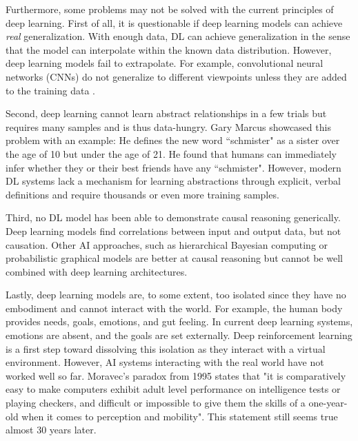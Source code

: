 Furthermore, some problems may not be solved with the current principles of deep learning.
First of all, it is questionable if deep learning models can achieve \emph{real} generalization.
With enough data, DL can achieve generalization in the sense that the model can interpolate within the known data distribution.
However, deep learning models fail to extrapolate.
For example, convolutional neural networks (CNNs) do not generalize to different viewpoints unless they are added to the training data .

Second, deep learning cannot learn abstract relationships in a few trials but requires many samples and is thus data-hungry.
Gary Marcus  showcased this problem with an example: He defines the new word ``schmister" as a sister over the age of 10 but under the age of 21. He found that humans can immediately infer whether they or their best friends have any ``schmister". However, modern DL systems lack a mechanism for learning abstractions through explicit, verbal definitions and require thousands or even more training samples.

Third, no DL model has been able to demonstrate causal reasoning generically.
Deep learning models find correlations between input and output data, but not causation.
Other AI approaches, such as hierarchical Bayesian computing or probabilistic graphical models are better at causal reasoning but cannot be well combined with deep learning architectures.

Lastly, deep learning models are, to some extent, too isolated since they have no embodiment and cannot interact with the world.
For example, the human body provides needs, goals, emotions, and gut feeling.
In current deep learning systems, emotions are absent, and the goals are set externally.
Deep reinforcement learning is a first step toward dissolving this isolation as they interact with a virtual environment. 
However, AI systems interacting with the real world have not worked well so far.
Moravec's paradox from 1995  states that "it is comparatively easy to make computers exhibit adult level performance on intelligence tests or playing checkers, and difficult or impossible to give them the skills of a one-year-old when it comes to perception and mobility".
This statement still seems true almost $30$ years later.



